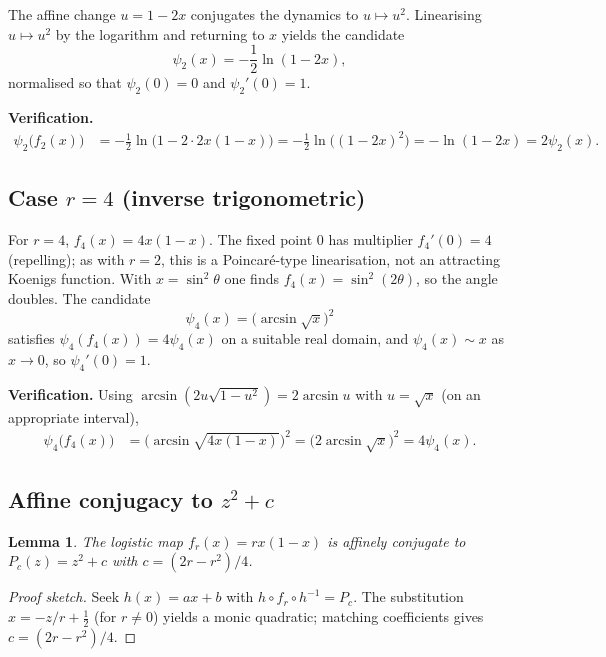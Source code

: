 \documentclass[11pt,a4paper]{article}
\theoremstyle{plain}
\newtheorem{lemma}[theorem]{Lemma}
\theoremstyle{definition}
\begin{document}
The affine change $u=1-2x$ conjugates the dynamics to $u\mapsto u^2$. Linearising $u\mapsto u^2$ by the logarithm and returning to $x$ yields the candidate
\begin{equation}
\label{eq:phi2}
\psi_2(x)=-\frac12\ln(1-2x),
\end{equation}
normalised so that $\psi_2(0)=0$ and $\psi_2'(0)=1$.

\textbf{Verification.}
\begin{align*}
\psi_2\bigl(f_2(x)\bigr)
&=
-\frac12\ln\bigl(1-2\cdot 2x(1-x)\bigr)
=
-\frac12\ln\bigl((1-2x)^2\bigr)
=
-\ln(1-2x)
=
2\psi_2(x).
\end{align*}

\subsection{Case $r=4$ (inverse trigonometric)}

For $r=4$, $f_4(x)=4x(1-x)$. The fixed point $0$ has multiplier $f_4'(0)=4$ (repelling); as with $r=2$, this is a Poincar\'e-type linearisation, not an attracting Koenigs function. With $x=\sin^2\theta$ one finds $f_4(x)=\sin^2(2\theta)$, so the angle doubles. The candidate
\begin{equation}
\label{eq:phi4}
\psi_4(x)=\bigl(\arcsin\sqrt{x}\bigr)^2
\end{equation}
satisfies $\psi_4(f_4(x))=4\psi_4(x)$ on a suitable real domain, and $\psi_4(x)\sim x$ as $x\to0$, so $\psi_4'(0)=1$.

\textbf{Verification.}
Using $\arcsin(2u\sqrt{1-u^2})=2\arcsin u$ with $u=\sqrt{x}$ (on an appropriate interval),
\begin{align*}
\psi_4\bigl(f_4(x)\bigr)
&=
\bigl(\arcsin\sqrt{4x(1-x)}\bigr)^2
=
\bigl(2\arcsin\sqrt{x}\bigr)^2
=
4\psi_4(x).
\end{align*}

\subsection{Affine conjugacy to $z^2+c$}

\begin{lemma}
\label{lem:affine}
The logistic map $f_r(x)=rx(1-x)$ is affinely conjugate to $P_c(z)=z^2+c$ with $c=(2r-r^2)/4$.
\end{lemma}

\begin{proof}[Proof sketch]
Seek $h(x)=ax+b$ with $h\circ f_r\circ h^{-1}=P_c$. The substitution $x=-z/r+\tfrac12$ (for $r\neq0$) yields a monic quadratic; matching coefficients gives $c=(2r-r^2)/4$.
\end{proof}
\end{document}
